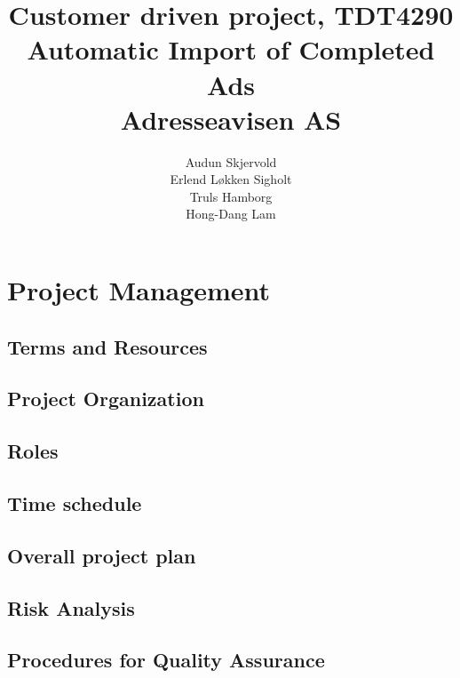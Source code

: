 \documentclass[12pt, a4paper]{article}
\title{\normalsize Customer driven project, TDT4290 \\ \LARGE \textbf{Automatic Import of Completed Ads} \normalsize \\Adresseavisen AS}
\author{Audun Skjervold \\ Erlend Løkken Sigholt \\ Truls Hamborg \\ Hong-Dang Lam}
\begin{document}
\maketitle 
\newpage
\tableofcontents
\newpage



 


\section{Project Management}
\subsection{Terms and Resources}
\subsection{Project Organization}
\subsection{Roles}

\subsection{Time schedule}
\subsection{Overall project plan}
\subsection{Risk Analysis}


\subsection{Procedures for Quality Assurance}












\end{document}
